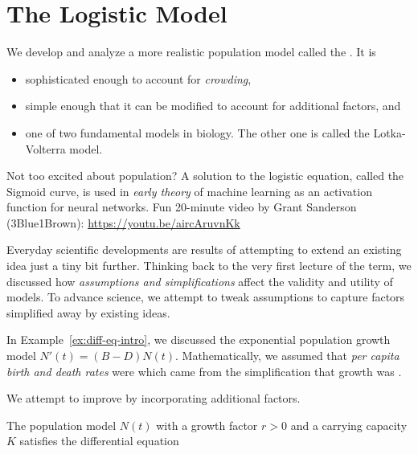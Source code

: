\documentclass[../main.tex]{subfiles}
\begin{document}
 \section{The Logistic Model}

We develop and analyze a more realistic population model called the .  It is
\begin{itemize}
  \item sophisticated enough to account for \emph{crowding}, 
  \item simple enough that it can be modified to account for additional factors, and
  \item one of two fundamental models in biology. The other one is called the Lotka-Volterra model.
\end{itemize}

{\footnotesize \faYoutube{} Not too excited about population? A solution to the logistic equation, called the Sigmoid curve, is used in \emph{early theory} of machine learning as an activation function for neural networks. Fun 20-minute video by Grant Sanderson (3Blue1Brown): \url{https://youtu.be/aircAruvnKk}}

Everyday scientific developments are results of attempting to extend an existing idea just a tiny bit further.  Thinking back to the very first lecture of the term, we discussed how \emph{assumptions and simplifications} affect the validity and utility of models.  To advance science, we attempt to tweak assumptions to capture factors simplified away by existing ideas. 

In Example~\ref{ex:diff-eq-intro}, we discussed the exponential population growth model \(N'(t) = (B - D) N(t)\). Mathematically, we assumed that \emph{per capita birth and death rates} were \underline{\hspace{2in}} which came from the simplification that growth was \underline{\hspace{1.5in}}. 

We attempt to improve by incorporating additional factors. 

\begin{definition}
  The population model \(N(t)\) with a growth factor \(r > 0\) and a carrying capacity \(K\) satisfies the differential equation
  \begin{equation} \label{eq:diff-eq-logistic}
    \phantom{N'(t) = r N(t) \left( 1 - \frac{K}{N(t)} \right).}
  \end{equation}
\end{definition}
\end{document}
